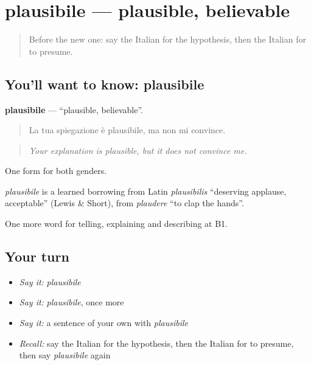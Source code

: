 \section[plausibile]{plausibile — plausible, believable}

\label{lesson:IT-C372-plausibile}



\begin{quote}
Before the new one: say the Italian for the hypothesis, then the Italian for to presume.
\end{quote}

\subsection*{You'll want to know: plausibile}
\textbf{plausibile} — \textquotedblleft{}plausible, believable\textquotedblright{}.

\begin{quote}
La tua spiegazione è plausibile, ma non mi convince.
\end{quote}

\begin{quote}
\emph{Your explanation is plausible, but it does not convince me.}
\end{quote}

One form for both genders.

\begin{cousinweb}
\emph{plausibile} is a learned borrowing from Latin \emph{plausibilis} \textquotedblleft{}deserving applause, acceptable\textquotedblright{} (Lewis \& Short), from \emph{plaudere} \textquotedblleft{}to clap the hands\textquotedblright{}.
\end{cousinweb}

\begin{grammarlens}[title={What you've built}]
One more word for telling, explaining and describing at B1.
\end{grammarlens}

\subsection*{Your turn}
\begin{itemize}
\raggedright
  \item \emph{Say it:} \emph{plausibile}
  \item \emph{Say it:} \emph{plausibile}, once more
  \item \emph{Say it:} a sentence of your own with \emph{plausibile}
  \item \emph{Recall:} say the Italian for the hypothesis, then the Italian for to presume, then say \emph{plausibile} again
\end{itemize}


